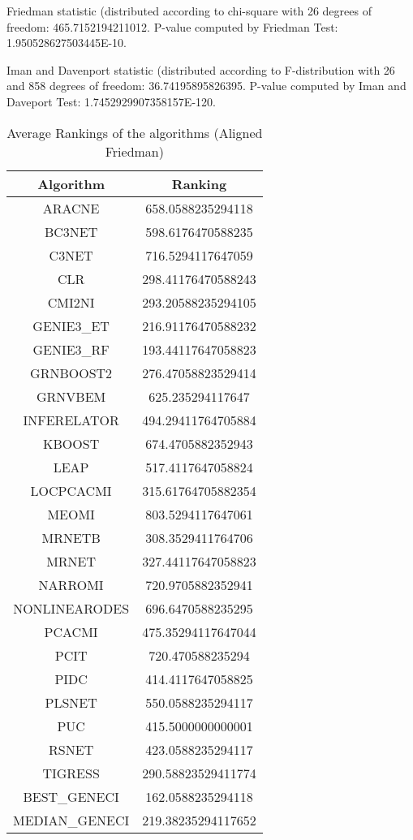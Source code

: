 \documentclass[a4paper,10pt]{article}
\begin{document}
\begin{landscape}
Friedman statistic (distributed according to chi-square with 26 degrees of freedom: 465.7152194211012. 
P-value computed by Friedman Test: 1.950528627503445E-10.\newline

Iman and Davenport statistic (distributed according to F-distribution with 26 and 858 degrees of freedom: 36.74195895826395. 
P-value computed by Iman and Daveport Test: 1.7452929907358157E-120.\newline


\newpage

\begin{table}[!htp]
\centering
\caption{Average Rankings of the algorithms (Aligned Friedman)
}\begin{tabular}{c|c}
Algorithm&Ranking\\
\hline
ARACNE&658.0588235294118\\
BC3NET&598.6176470588235\\
C3NET&716.5294117647059\\
CLR&298.41176470588243\\
CMI2NI&293.20588235294105\\
GENIE3_ET&216.91176470588232\\
GENIE3_RF&193.44117647058823\\
GRNBOOST2&276.47058823529414\\
GRNVBEM&625.235294117647\\
INFERELATOR&494.29411764705884\\
KBOOST&674.4705882352943\\
LEAP&517.4117647058824\\
LOCPCACMI&315.61764705882354\\
MEOMI&803.5294117647061\\
MRNETB&308.3529411764706\\
MRNET&327.44117647058823\\
NARROMI&720.9705882352941\\
NONLINEARODES&696.6470588235295\\
PCACMI&475.35294117647044\\
PCIT&720.470588235294\\
PIDC&414.4117647058825\\
PLSNET&550.0588235294117\\
PUC&415.5000000000001\\
RSNET&423.0588235294117\\
TIGRESS&290.58823529411774\\
BEST_GENECI&162.0588235294118\\
MEDIAN_GENECI&219.38235294117652\\
\end{tabular}
\end{table}



\end{landscape}
\end{document}
